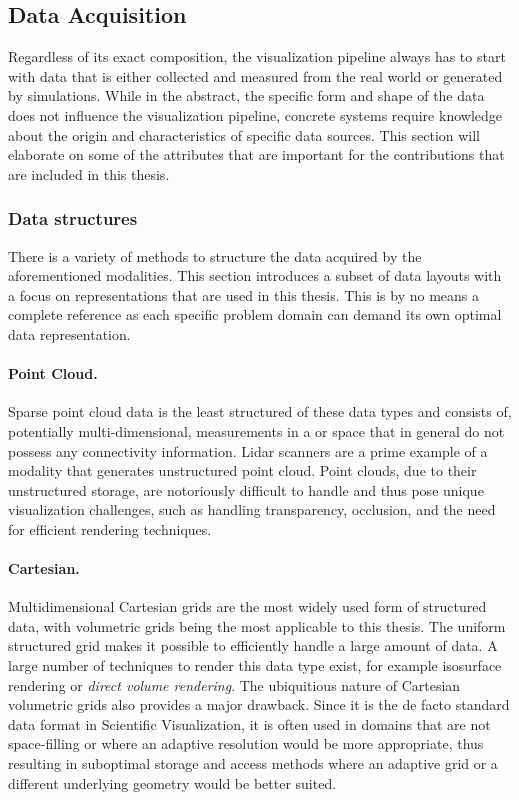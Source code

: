 \subsection{Data Acquisition} \label{cha:intro:vp:da}
Regardless of its exact composition, the visualization pipeline always has to start with data that is either collected and measured from the real world or generated by simulations.  While in the abstract, the specific form and shape of the data does not influence the visualization pipeline, concrete systems require knowledge about the origin and characteristics of specific data sources.  This section will elaborate on some of the attributes that are important for the contributions that are included in this thesis.

\subsubsection{Data structures} \label{cha:intro:vp:da:datastructures}
There is a variety of methods to structure the data acquired by the aforementioned modalities.  This section introduces a subset of data layouts with a focus on representations that are used in this thesis.  This is by no means a complete reference as each specific problem domain can demand its own optimal data representation.

\paragraph{Point Cloud. }  Sparse point cloud data is the least structured of these data types and consists of, potentially multi-dimensional, measurements in a  or  space that in general do not possess any connectivity information.  Lidar scanners are a prime example of a modality that generates unstructured point cloud.  Point clouds, due to their unstructured storage, are notoriously difficult to handle and thus pose unique visualization challenges, such as handling transparency, occlusion, and the need for efficient rendering techniques.

\paragraph{Cartesian. }  Multidimensional Cartesian grids are the most widely used form of structured data, with  volumetric grids being the most applicable to this thesis.  The uniform structured grid makes it possible to efficiently handle a large amount of data.  A large number of techniques to render this data type exist, for example isosurface rendering or \emph{direct volume rendering}.  The ubiquitious nature of Cartesian volumetric grids also provides a major drawback.  Since it is the de facto standard data format in Scientific Visualization, it is often used in domains that are not space-filling or where an adaptive resolution would be more appropriate, thus resulting in suboptimal storage and access methods where an adaptive grid or a different underlying geometry would be better suited.

